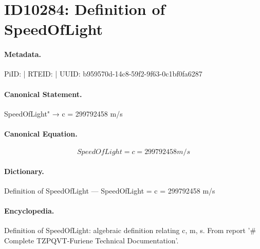 \section*{ID10284: Definition of SpeedOfLight}
\paragraph{Metadata.}
PiID:  | RTEID:  | UUID: b959570d-14c8-59f2-9f63-0c1bf0fa6287

\paragraph{Canonical Statement.}
SpeedOfLight" → c = 299792458 m/s

\paragraph{Canonical Equation.}
\[
SpeedOfLight = c = 299792458 m/s
\]

\paragraph{Dictionary.}
Definition of SpeedOfLight — SpeedOfLight = c = 299792458 m/s

\paragraph{Encyclopedia.}
Definition of SpeedOfLight: algebraic definition relating c, m, s. From report '\# Complete TZPQVT-Furiene Technical Documentation'.
